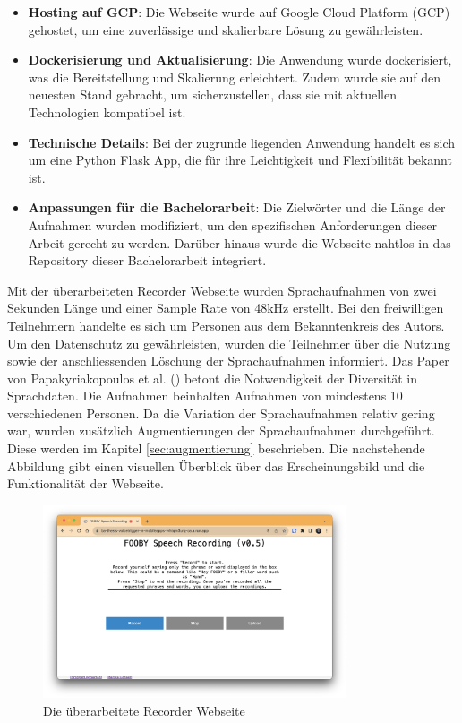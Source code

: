 \documentclass[11pt,a4paper]{article}
\begin{document}
\begin{itemize}
    \item \textbf{Hosting auf GCP}: Die Webseite wurde auf Google Cloud Platform (GCP) gehostet, um 
	eine zuverlässige und skalierbare Lösung zu gewährleisten.
    \item \textbf{Dockerisierung und Aktualisierung}: Die Anwendung wurde dockerisiert, was die 
	Bereitstellung und Skalierung erleichtert. Zudem wurde sie auf den neuesten Stand gebracht, um 
	sicherzustellen, dass sie mit aktuellen Technologien kompatibel ist.
    \item \textbf{Technische Details}: Bei der zugrunde liegenden Anwendung handelt es sich um eine 
	Python Flask App, die für ihre Leichtigkeit und Flexibilität bekannt ist.
    \item \textbf{Anpassungen für die Bachelorarbeit}: Die Zielwörter und die Länge der Aufnahmen 
	wurden modifiziert, um den spezifischen Anforderungen dieser Arbeit gerecht zu werden. Darüber 
	hinaus wurde die Webseite nahtlos in das Repository dieser Bachelorarbeit integriert.
\end{itemize}

\noindent \newline
Mit der überarbeiteten Recorder Webseite wurden Sprachaufnahmen von zwei Sekunden Länge und einer 
Sample Rate von 48kHz erstellt. Bei den freiwilligen Teilnehmern handelte es sich um Personen aus 
dem Bekanntenkreis des Autors. Um den Datenschutz zu gewährleisten, wurden die Teilnehmer über die 
Nutzung sowie der anschliessenden Löschung der Sprachaufnahmen informiert. Das Paper von Papakyriakopoulos et al. 
(\cite{papakyriakopoulos2023augmented}) betont die Notwendigkeit der Diversität in Sprachdaten. Die 
Aufnahmen beinhalten Aufnahmen von mindestens 10 verschiedenen Personen. Da die Variation der 
Sprachaufnahmen relativ gering war, wurden zusätzlich Augmentierungen der Sprachaufnahmen 
durchgeführt. Diese werden im Kapitel \ref{sec:augmentierung} beschrieben. Die nachstehende 
Abbildung gibt einen visuellen Überblick über das Erscheinungsbild und die Funktionalität der 
Webseite.

\begin{figure}[h]
    \centering
    \includegraphics[width=0.8\textwidth]{img/ba-recorder-website.png} 
    \caption{Die überarbeitete Recorder Webseite}
    \label{fig:recorder_webseite}
\end{figure}
\end{document}

